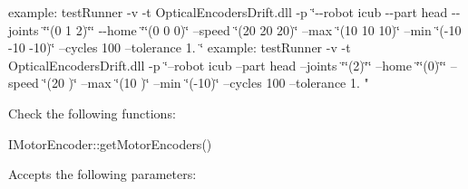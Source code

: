 example\+: test\+Runner -\/v -\/t Optical\+Encoders\+Drift.\+dll -\/p \char`\"{}-\/-\/robot icub -\/-\/part head -\/-\/joints \char`\"{}\char`\"{}(0 1 2)\char`\"{}\char`\"{} -\/-\/home \char`\"{}\char`\"{}(0 0 0)\char`\"{} --speed \char`\"{}(20 20 20)\char`\"{} --max \char`\"{}(10 10 10)\char`\"{} --min \char`\"{}(-\/10 -\/10 -\/10)\char`\"{} --cycles 100 --tolerance 1. \char`\"{}
example\+: test\+Runner -\/v -\/t Optical\+Encoders\+Drift.\+dll -\/p \char`\"{}--robot icub --part head --joints \char`\"{}\char`\"{}(2)\char`\"{}\char`\"{} --home \char`\"{}\char`\"{}(0)\char`\"{}\char`\"{} --speed \char`\"{}(20      )\char`\"{} --max \char`\"{}(10      )\char`\"{} --min \char`\"{}(-\/10)\char`\"{} --cycles 100 --tolerance 1. "

Check the following functions\+: \begin{DoxyItemize}
\item I\+Motor\+Encoder\+::get\+Motor\+Encoders()\end{DoxyItemize}
Accepts the following parameters\+: \tabulinesep=1mm
